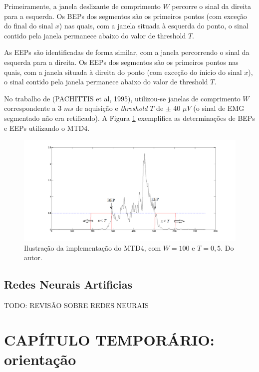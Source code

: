 \documentclass[
	12pt,				%
	openright,			%
	oneside,
	a4paper,			%
	english,			%
	francais,			%
	spanish,			%
	brazil				%
	]{abntex2}
\begin{document}
	Primeiramente, a janela deslizante de comprimento $W$ percorre o sinal da direita para a esquerda. Os BEPs dos segmentos são os primeiros pontos (com exceção do final do sinal $x$) nas quais, com a janela situada à esquerda do ponto, o sinal contido pela janela permanece abaixo do valor de threshold $T$.
	
	As EEPs são identificadas de forma similar, com a janela percorrendo o sinal da esquerda para a direita. Os EEPs dos segmentos são os primeiros pontos nas quais, com a janela situada à direita do ponto (com exceção do ínicio do sinal $x$), o sinal contido pela janela permanece abaixo do valor de threshold $T$.
	
	No trabalho de (PACHITTIS et al, 1995), utilizou-se janelas de comprimento $W$ correspondente a 3 $ms$ de aquisição e \emph{threshold} $T$ de $\pm$ 40 $\mu V$ (o sinal de EMG segmentado não era retificado). A Figura \ref{fig:mtd4example} exemplifica as determinações de BEPs e EEPs utilizando o MTD4.
	
\begin{figure}
\centering
\includegraphics[width=\linewidth]{./img/mtd4ex.png}
\caption{Ilustração da implementação do MTD4, com $W = 100$ e $T = 0,5$. Do autor.}
\label{fig:mtd4example}
\end{figure}

\section{Redes Neurais Artificias}

	TODO: REVISÃO SOBRE REDES NEURAIS

\chapter{CAPÍTULO TEMPORÁRIO: orientação}
\end{document}
